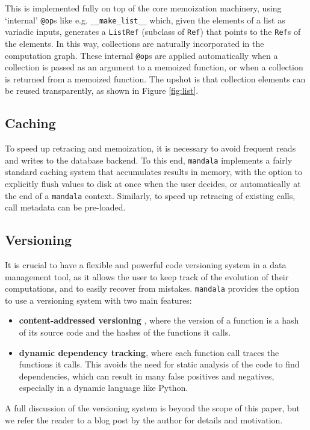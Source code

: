\documentclass{article} %
\begin{document}
This is implemented fully on top of the core memoization machinery, using
`internal' \texttt{@op}s like e.g. \verb|__make_list__| which, given the
elements of a list as variadic inputs, generates a \texttt{ListRef} (subclass of
\texttt{Ref}) that points to the \texttt{Ref}s of the elements. In this way,
collections are naturally incorporated in the computation graph. These internal
\texttt{@op}s are applied automatically when a collection is passed as an
argument to a memoized function, or when a collection is returned from a
memoized function. The upshot is that collection elements can be reused
transparently, as shown in Figure \ref{fig:list}.

\subsection{Caching}
To speed up retracing and memoization, it is necessary to avoid frequent reads
and writes to the database backend. To this end, \texttt{mandala} implements a
fairly standard caching system that accumulates results in memory, with the
option to explicitly flush values to disk at once when the user decides, or
automatically at the end of a \texttt{mandala} context. Similarly, to speed up
retracing of existing calls, call metadata can be pre-loaded.

\subsection{Versioning}
\label{subsection:versioning}

It is crucial to have a flexible and powerful code versioning system in a data
management tool, as it allows the user to keep track of the evolution of their
computations, and to easily recover from mistakes. \texttt{mandala} provides the
option to use a versioning system with two main features:
\begin{itemize}
\item \textbf{content-addressed versioning} \citep{git}, where the version of a
function is a hash of its source code and the hashes of the functions it calls.
\item \textbf{dynamic dependency tracking}, where each function call traces the
functions it calls. This avoids the need for static analysis of the code to find
dependencies, which can result in many false positives and negatives, especially
in a dynamic language like Python.
\end{itemize}

A full discussion of the versioning system is beyond the scope of this paper,
but we refer the reader to a blog post by the author
\citep{makelov2023practical} for details and motivation.
\end{document}
